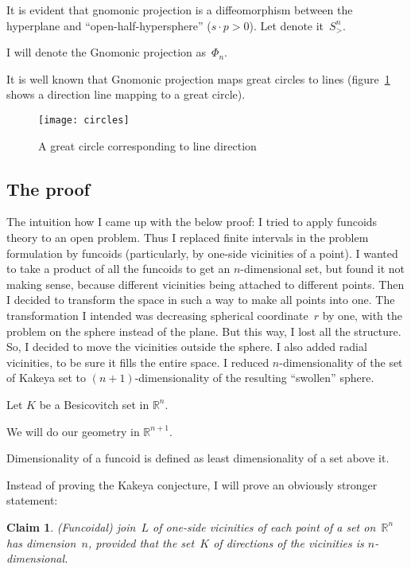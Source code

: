 \documentclass[oneside,draft]{amsart}
\newtheorem{claim}{Claim}
\begin{document}
It is evident that gnomonic projection is a diffeomorphism between the hyperplane and ``open-half-hy\-per\-sphe\-re'' ($s\cdot p>0$). Let denote it~$S^n_{>}$.

I will denote the Gnomonic projection as~$\Phi_n$.

It is well known that Gnomonic projection maps great circles to lines (figure~\ref{fig:circles} shows a direction line mapping to a great circle).

\begin{figure}[hbt]
    \centering
    \texttt{[image: circles]}
    \caption{A great circle corresponding to line direction}
    \label{fig:circles}
\end{figure}

\subsection{The proof}

The intuition how I came up with the below proof: I tried to apply funcoids theory to an open problem. Thus I replaced finite intervals in the problem formulation by funcoids (particularly, by one-si\-de vicinities of a point). I wanted to take a product of all the funcoids to get an $n$-di\-men\-si\-on\-al set, but found it not making sense, because different vicinities being attached to different points. Then I decided to transform the space in such a way to make all points into one. The transformation I intended was decreasing spherical coordinate~$r$ by one, with the problem on the sphere instead of the plane. But this way, I lost all the structure. So, I decided to move the vicinities outside the sphere. I also added radial vicinities, to be sure it fills the entire space. I reduced $n$-di\-men\-sio\-na\-li\-ty of the set of Kakeya set to $(n+1)$-di\-men\-sio\-na\-li\-ty of the resulting ``swollen'' sphere.

Let $K$ be a Besicovitch set in $\mathbb{R}^n$.

We will do our geometry in $\mathbb{R}^{n+1}$.

Dimensionality of a funcoid is defined as least dimensionality of a set above it.

Instead of proving the Kakeya conjecture, I will prove an obviously stronger statement:

\begin{claim}
(Funcoidal) join~$L$ of one-si\-de vicinities of each point of a set on~$\mathbb{R}^n$ has dimension~$n$, provided that the set~$K$ of directions of the vicinities is $n$-di\-men\-sio\-nal.
\end{claim}
\end{document}
